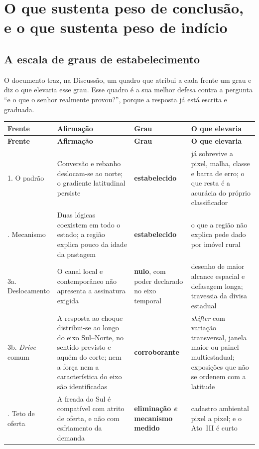 \part{O que sustenta peso de conclusão, e o que sustenta peso de indício}

\chapter{A escala de graus de estabelecimento}

O documento traz, na Discussão, um quadro que atribui a cada frente um grau e
diz o que elevaria esse grau. Esse quadro é a sua melhor defesa contra a
pergunta ``e o que o senhor realmente provou?'', porque a resposta já está
escrita e graduada.

\vspace{6pt}
\begin{longtable}{@{}p{2.0cm}p{5.4cm}p{2.4cm}p{4.6cm}@{}}
\toprule
\textbf{Frente} & \textbf{Afirmação} & \textbf{Grau} & \textbf{O que elevaria} \\
\midrule
\endfirsthead
\toprule
\textbf{Frente} & \textbf{Afirmação} & \textbf{Grau} & \textbf{O que elevaria} \\
\midrule
\endhead
1. O padrão &
Conversão e rebanho deslocam-se ao norte; o gradiente latitudinal persiste &
\textbf{estabelecido} &
já sobrevive a pixel, malha, classe e barra de erro; o que resta é a acurácia do
próprio classificador \\
\addlinespace
2. Mecanismo &
Duas lógicas coexistem em todo o estado; a região explica pouco da idade da
pastagem &
\textbf{estabelecido} &
o que a região não explica pede dado por imóvel rural \\
\addlinespace
3a. Deslocamento &
O canal local e contemporâneo não apresenta a assinatura exigida &
\textbf{nulo}, com poder declarado no eixo temporal &
desenho de maior alcance espacial e defasagem longa; travessia da divisa
estadual \\
\addlinespace
3b. \emph{Drive} comum &
A resposta ao choque distribui-se ao longo do eixo Sul--Norte, no sentido
previsto e aquém do corte; nem a força nem a característica do eixo são
identificadas &
\textbf{corroborante} &
\emph{shifter} com variação transversal, janela maior ou painel multiestadual;
exposições que não se ordenem com a latitude \\
\addlinespace
4. Teto de oferta &
A freada do Sul é compatível com atrito de oferta, e não com esfriamento da
demanda &
\textbf{eliminação \emph{e} mecanismo medido} &
cadastro ambiental pixel a pixel; e o Ato~III é curto \\
\bottomrule
\end{longtable}

